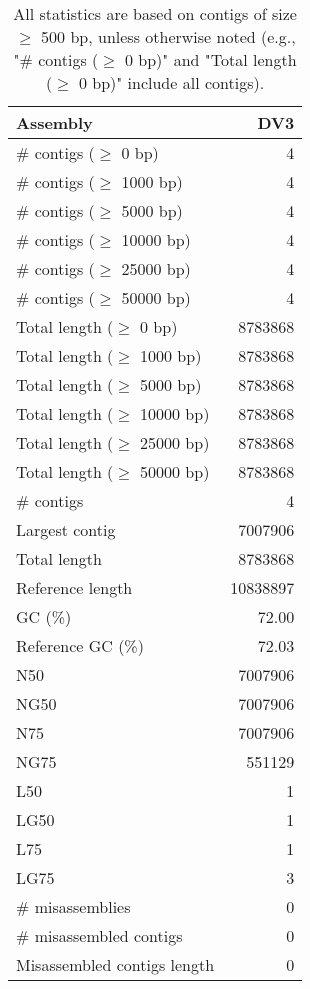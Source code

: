 \documentclass[12pt,a4paper]{article}
\begin{document}
\begin{table}[ht]
\begin{center}
\caption{All statistics are based on contigs of size $\geq$ 500 bp, unless otherwise noted (e.g., "\# contigs ($\geq$ 0 bp)" and "Total length ($\geq$ 0 bp)" include all contigs).}
\begin{tabular}{|l*{1}{|r}|}
\hline
Assembly & DV3 \\ \hline
\# contigs ($\geq$ 0 bp) & 4 \\ \hline
\# contigs ($\geq$ 1000 bp) & 4 \\ \hline
\# contigs ($\geq$ 5000 bp) & 4 \\ \hline
\# contigs ($\geq$ 10000 bp) & 4 \\ \hline
\# contigs ($\geq$ 25000 bp) & 4 \\ \hline
\# contigs ($\geq$ 50000 bp) & 4 \\ \hline
Total length ($\geq$ 0 bp) & 8783868 \\ \hline
Total length ($\geq$ 1000 bp) & 8783868 \\ \hline
Total length ($\geq$ 5000 bp) & 8783868 \\ \hline
Total length ($\geq$ 10000 bp) & 8783868 \\ \hline
Total length ($\geq$ 25000 bp) & 8783868 \\ \hline
Total length ($\geq$ 50000 bp) & 8783868 \\ \hline
\# contigs & 4 \\ \hline
Largest contig & 7007906 \\ \hline
Total length & 8783868 \\ \hline
Reference length & 10838897 \\ \hline
GC (\%) & 72.00 \\ \hline
Reference GC (\%) & 72.03 \\ \hline
N50 & 7007906 \\ \hline
NG50 & 7007906 \\ \hline
N75 & 7007906 \\ \hline
NG75 & 551129 \\ \hline
L50 & 1 \\ \hline
LG50 & 1 \\ \hline
L75 & 1 \\ \hline
LG75 & 3 \\ \hline
\# misassemblies & 0 \\ \hline
\# misassembled contigs & 0 \\ \hline
Misassembled contigs length & 0 \\ \hline

\end{tabular}
\end{center}
\end{table}
\end{document}
